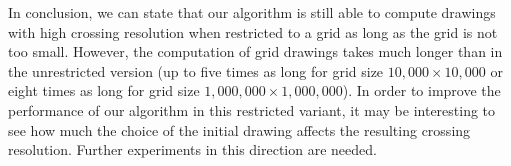 \documentclass[runningheads]{llncs}
\begin{document}
In conclusion, we can state that our algorithm is still able to compute drawings with high crossing resolution when restricted to a grid as long as the grid is not too small. However, the computation of grid drawings takes much longer than in the unrestricted version (up to five times as long for grid size $10,000 \times 10,000$ or eight times as long for grid size $1,000,000 \times 1,000,000$). In order to improve the performance of our algorithm in this restricted variant, it may be interesting to see how much the choice of the initial drawing affects the resulting crossing resolution. Further experiments in this direction are needed.
\end{document}

